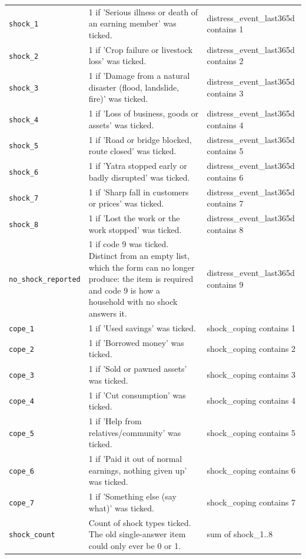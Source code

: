 \documentclass[10pt]{article}
\begin{document}
{\begin{longtable}{p{3.3cm}p{7.6cm}p{5.7cm}}
\texttt{shock\_1} & 1 if 'Serious illness or death of an earning member' was ticked. & distress\_event\_last365d contains 1 \\
\texttt{shock\_2} & 1 if 'Crop failure or livestock loss' was ticked. & distress\_event\_last365d contains 2 \\
\texttt{shock\_3} & 1 if 'Damage from a natural disaster (flood, landslide, fire)' was ticked. & distress\_event\_last365d contains 3 \\
\texttt{shock\_4} & 1 if 'Loss of business, goods or assets' was ticked. & distress\_event\_last365d contains 4 \\
\texttt{shock\_5} & 1 if 'Road or bridge blocked, route closed' was ticked. & distress\_event\_last365d contains 5 \\
\texttt{shock\_6} & 1 if 'Yatra stopped early or badly disrupted' was ticked. & distress\_event\_last365d contains 6 \\
\texttt{shock\_7} & 1 if 'Sharp fall in customers or prices' was ticked. & distress\_event\_last365d contains 7 \\
\texttt{shock\_8} & 1 if 'Lost the work or the work stopped' was ticked. & distress\_event\_last365d contains 8 \\
\texttt{no\_shock\_reported} & 1 if code 9 was ticked. Distinct from an empty list, which the form can no longer produce: the item is required and code 9 is how a household with no shock answers it. & distress\_event\_last365d contains 9 \\
\texttt{cope\_1} & 1 if 'Used savings' was ticked. & shock\_coping contains 1 \\
\texttt{cope\_2} & 1 if 'Borrowed money' was ticked. & shock\_coping contains 2 \\
\texttt{cope\_3} & 1 if 'Sold or pawned assets' was ticked. & shock\_coping contains 3 \\
\texttt{cope\_4} & 1 if 'Cut consumption' was ticked. & shock\_coping contains 4 \\
\texttt{cope\_5} & 1 if 'Help from relatives/community' was ticked. & shock\_coping contains 5 \\
\texttt{cope\_6} & 1 if 'Paid it out of normal earnings, nothing given up' was ticked. & shock\_coping contains 6 \\
\texttt{cope\_7} & 1 if 'Something else (say what)' was ticked. & shock\_coping contains 7 \\
\texttt{shock\_count} & Count of shock types ticked. The old single-answer item could only ever be 0 or 1. & sum of shock\_1..8 \\

\end{longtable}}
\end{document}
